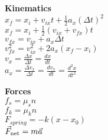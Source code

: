 \documentclass[12pt]{article}
\begin{document}
\begin{twocolumn}
\begin{flushleft}
{\bf Kinematics}\\
\medskip
$\displaystyle x_f = x_i + v_{ix} t + \frac{1}{2} a_x (\Delta t)^2$ \\
\medskip
$\displaystyle x_f = x_i + \frac{1}{2} ( v_{ix} + v_{fx})t$  \\
\medskip
$\displaystyle v_{fx} = v_{ix} + a_x \Delta t $ \\
\medskip
$\displaystyle v_{fx}^2 = v_{ix}^2 + 2 a_x (x_f - x_i)$\\
\medskip
$\displaystyle v_{x} = \frac{\Delta x}{\Delta t} = \frac{dx}{dt} $\\
\medskip
$\displaystyle a_{x} = \frac{\Delta v_x}{\Delta t} = \frac{dv_x}{dt} = \frac{d^2x}{dt^2} $\\
\medskip

\bigskip
{\bf Forces}\\
\medskip
$\displaystyle f_{s} = \mu_{s} n$ \\
\medskip
$\displaystyle f_{k} = \mu_{k} n$ \\
\medskip
$\displaystyle F_{spring} = -k (x - x_0)$\\
\medskip
$\displaystyle \vec{F}_{\rm net} =  m \vec{a}$ \\
\medskip


\end{flushleft}
\end{twocolumn}
\end{document}
